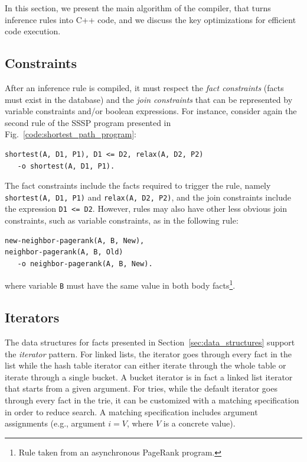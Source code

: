 
In this section, we present the main algorithm of the compiler, that turns
inference rules into C++ code, and we discuss the key optimizations for
efficient code execution.

\subsection{Constraints}

After an inference rule is compiled, it must respect the \emph{fact constraints}
(facts must exist in the database) and the \emph{join constraints} that can be
represented by variable constraints and/or boolean expressions. For instance,
consider again the second rule of the SSSP program presented in
Fig.~\ref{code:shortest_path_program}:

\begin{Verbatim}[fontsize=\scriptsize,label=example_rule]
shortest(A, D1, P1), D1 <= D2, relax(A, D2, P2)
   -o shortest(A, D1, P1).
\end{Verbatim}

The fact constraints include the facts required to trigger the rule, namely
\texttt{shortest(A, D1, P1)} and \texttt{relax(A, D2, P2)}, and the join
constraints include the expression \texttt{D1 <= D2}.  However, rules may also
have other less obvious join constraints, such as variable constraints, as in
the following rule:

\begin{Verbatim}[fontsize=\scriptsize]
new-neighbor-pagerank(A, B, New),
neighbor-pagerank(A, B, Old)
   -o neighbor-pagerank(A, B, New).
\end{Verbatim}

\noindent where variable \texttt{B} must have the same value in both body
facts\footnote{Rule taken from an asynchronous PageRank program.}.

\subsection{Iterators}

The data structures for facts presented in Section~\ref{sec:data_structures}
support the \emph{iterator} pattern. For linked lists, the iterator goes through
every fact in the list while the hash table iterator can either iterate through
the whole table or iterate through a single bucket. A bucket iterator is in fact
a linked list iterator that starts from a given argument.  For tries, while the
default iterator goes through every fact in the trie, it can be customized with
a matching specification in order to reduce search. A matching specification
includes argument assignments (e.g., argument $i = V$, where $V$ is a concrete
value).

